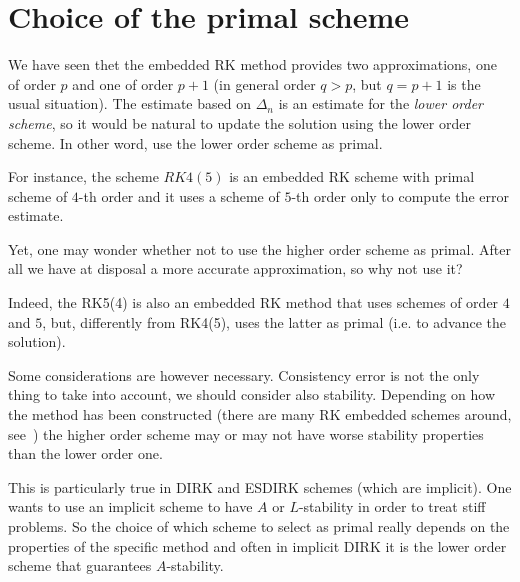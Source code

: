 \documentclass[10pt,a4paper,twoside]{article}
\begin{document}
\section{Choice of the primal scheme}
We have seen thet the embedded RK method provides two approximations, one of order $p$ and one of order $p+1$ (in general order $q>p$, but $q=p+1$ is the usual situation). The estimate based on $\Delta_n$ is an estimate for the \emph{lower order scheme}, so it would be natural to update
the solution using the lower order scheme. In other word, use the lower order scheme as primal.

For instance, the scheme $RK4(5)$ is an embedded RK scheme with primal scheme of $4$-th order and it uses a scheme of $5$-th order only to compute the error estimate.

Yet, one may wonder whether not to use the higher order scheme as primal. After all we have at disposal a more accurate approximation, so why not use it?

Indeed, the RK5(4) is also an embedded RK method that uses schemes of order $4$ and $5$, but, differently from RK4(5), uses the latter as primal (i.e. to advance the solution).

Some considerations are however necessary. Consistency error is not the only thing to take into account, we should consider also stability. Depending on how the method has been constructed (there are many RK embedded schemes around, see~\cite{RungeKuttaMethods2016}) the higher order scheme may or may not have worse stability properties than the lower order one.

This is particularly true in DIRK and ESDIRK schemes (which are implicit). One wants to use an implicit scheme to have $A$ or $L$-stability in order to treat stiff problems. So the choice of which scheme to select as primal really depends on the properties of the specific method and often in implicit DIRK it is the lower order scheme that guarantees $A$-stability.




\end{document}
